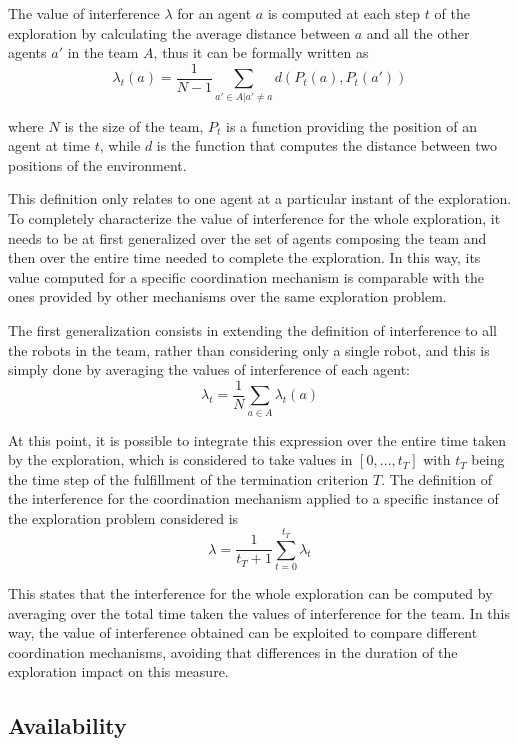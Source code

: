 The value of interference $\lambda$ for an agent $a$ is computed
at each step $t$ of the exploration by calculating the average distance
between $a$ and all the other agents $a'$ in the team $A$, thus
it can be formally written as 
\[
\lambda_{t}\left(a\right)=\frac{1}{N-1}\sum_{a'\in A|a'\neq a}d\left(P_{t}\left(a\right),P_{t}\left(a'\right)\right)
\]

where $N$ is the size of the team, $P_{t}$ is a function providing
the position of an agent at time $t$, while $d$ is the function
that computes the distance between two positions of the environment. 

This definition only relates to one agent at a particular instant
of the exploration. To completely characterize the value of interference
for the whole exploration, it needs to be at first generalized over
the set of agents composing the team and then over the entire time
needed to complete the exploration. In this way, its value computed
for a specific coordination mechanism is comparable with the ones
provided by other mechanisms over the same exploration problem. 

The first generalization consists in extending the definition of interference
to all the robots in the team, rather than considering only a single
robot, and this is simply done by averaging the values of interference
of each agent:
\[
\lambda_{t}=\frac{1}{N}\sum_{a\in A}\lambda_{t}\left(a\right)
\]

At this point, it is possible to integrate this expression over the
entire time taken by the exploration, which is considered to take
values in $\left[0,\ldots,t_{T}\right]$ with $t_{T}$ being the time
step of the fulfillment of the termination criterion $T$. The definition
of the interference for the coordination mechanism applied to a specific
instance of the exploration problem considered is 
\[
\lambda=\frac{1}{t_{T}+1}\sum_{t=0}^{t_{T}}\lambda_{t}
\]

This states that the interference for the whole exploration can be
computed by averaging over the total time taken the values of interference
for the team. In this way, the value of interference obtained can
be exploited to compare different coordination mechanisms, avoiding
that differences in the duration of the exploration impact on this
measure. 

\subsection{Availability}

